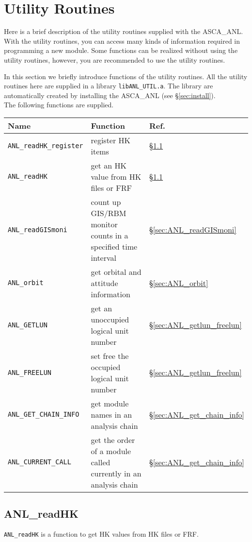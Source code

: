 \chapter{Utility Routines}\label{chap:utility-routines}
Here is a brief description of the utility routines
supplied with the ASCA\_ANL.
With the utility routines,
you can access many kinds of information
required in programming a new module.
Some functions can be realized without using the utility routines,
however, you are recommended to use the utility routines.

In this section
we briefly introduce functions of the utility routines.
All the utility routines here are supplied in a library {\tt libANL\_UTIL.a}.
The library are automatically created by installing the ASCA\_ANL
(see \S \ref{sec:install}).\\

The following functions are supplied.
\begin{center}
\begin{tabular}{lll} \hline
Name & Function & Ref. \\ \hline
{\tt ANL\_readHK\_register} & register HK items & \S\ref{sec:ANL_readHK} \\
{\tt ANL\_readHK} & get an HK value from HK files or FRF& \S\ref{sec:ANL_readHK} \\
{\tt ANL\_readGISmoni} & count up GIS/RBM monitor counts in a specified time interval & \S\ref{sec:ANL_readGISmoni} \\
{\tt ANL\_orbit}  & get orbital and attitude information & \S\ref{sec:ANL_orbit} \\
{\tt ANL\_GETLUN} & get an unoccupied logical unit number & \S\ref{sec:ANL_getlun_freelun}\\
{\tt ANL\_FREELUN} & set free the occupied logical unit number & \S\ref{sec:ANL_getlun_freelun} \\
{\tt ANL\_GET\_CHAIN\_INFO} & get module names in an analysis chain & \S\ref{sec:ANL_get_chain_info} \\
{\tt ANL\_CURRENT\_CALL} & get the order of a module called currently in an analysis chain & \S\ref{sec:ANL_get_chain_info} \\ \hline
\end{tabular}   
\end{center}

\section{ANL\_readHK}\label{sec:ANL_readHK}
{\tt ANL\_readHK} is a function to get HK values from HK files or FRF.


